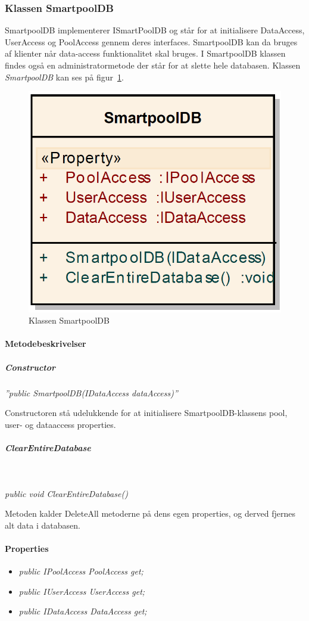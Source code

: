 \subsubsection{Klassen SmartpoolDB}
SmartpoolDB implementerer ISmartPoolDB og står for at initialisere DataAccess, UserAccess og PoolAccess gennem deres interfaces. SmartpoolDB kan da bruges af klienter når data-access funktionalitet skal bruges. I SmartpoolDB klassen findes også en administratormetode der står for at slette hele databasen. Klassen \textit{SmartpoolDB} kan ses på figur~\ref{fig:smartpoolDBClass}.

\begin{figure}[H]
\centering
\includegraphics[width=0.3\linewidth]{figs/implementering/smartpoolDBClass.PNG}
\caption{Klassen SmartpoolDB}
\label{fig:smartpoolDBClass}
\end{figure}

\paragraph{Metodebeskrivelser}
\subparagraph{Constructor}
\textit{''public SmartpoolDB(IDataAccess dataAccess)''}

Constructoren stå udelukkende for at initialisere SmartpoolDB-klassens pool, user- og dataaccess properties.

\subparagraph{ClearEntireDatabase}\

\textit{public void ClearEntireDatabase()}

Metoden kalder DeleteAll metoderne på dens egen properties, og derved fjernes alt data i databasen.

\paragraph{Properties}

\begin{itemize}
	\item \textit{public IPoolAccess PoolAccess { get; }}
	\item \textit{public IUserAccess UserAccess { get; }}
	\item \textit{public IDataAccess DataAccess { get; }}
\end{itemize}





